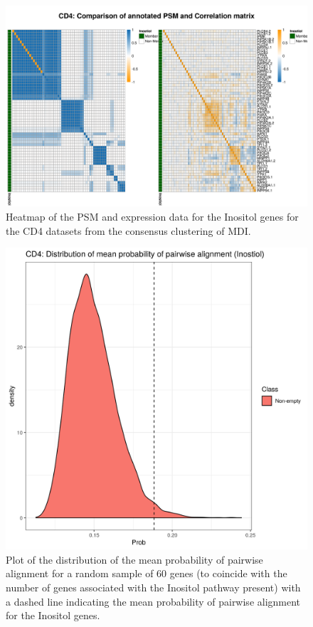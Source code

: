 \documentclass[12pt]{article} %
\begin{document}
	\begin{figure}
		\centering
		\includegraphics[scale=0.75]{Images/Biology_data/Set_250/All_datasets/Heatmaps/KEGG_INOSITOL_PHOSPHATE_METABOLISM/CD4_comp_psm_corr.png}
		\caption{Heatmap of the PSM and expression data for the Inositol genes for the CD4 datasets from the consensus clustering of MDI.}
		\label{fig:results:cedar_1:mdi_cd4_inostiol_psm_cor}
	\end{figure}


\begin{figure}[h]
	\centering
	\includegraphics[scale=0.75]{Images/Biology_data/Set_250/All_datasets/Mean_alignment_probability/CD4_KEGG_INOSITOL_PHOSPHATE_METABOLISM.png}
	\caption{Plot of the distribution of the mean probability of pairwise alignment for a random sample of 60 genes (to coincide with the number of genes associated with the Inositol pathway present) with a dashed line indicating the mean probability of pairwise alignment for the Inositol genes.}
	\label{fig:results:cedar_1:mdi_cd4_inostiol_alignemnt_prob_distn}
\end{figure}
\end{document}
